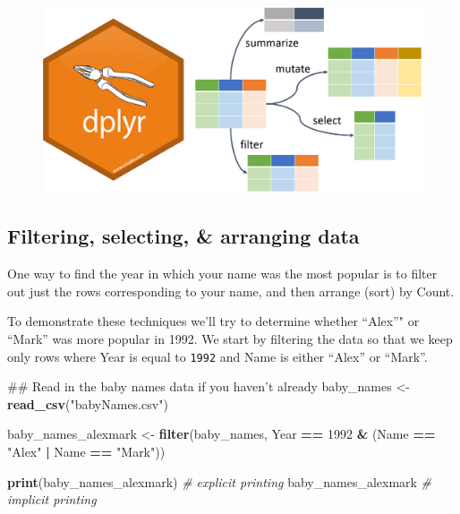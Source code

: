 \documentclass[]{book}
\newenvironment{Shaded}{\begin{snugshade}}{\end{snugshade}}
\newcommand{\KeywordTok}[1]{\textcolor[rgb]{0.13,0.29,0.53}{\textbf{#1}}}
\newcommand{\DecValTok}[1]{\textcolor[rgb]{0.00,0.00,0.81}{#1}}
\newcommand{\StringTok}[1]{\textcolor[rgb]{0.31,0.60,0.02}{#1}}
\newcommand{\CommentTok}[1]{\textcolor[rgb]{0.56,0.35,0.01}{\textit{#1}}}
\newcommand{\OperatorTok}[1]{\textcolor[rgb]{0.81,0.36,0.00}{\textbf{#1}}}
\newcommand{\NormalTok}[1]{#1}
\begin{document}
\begin{figure}
\centering
\includegraphics{R/Rintro/images/dplyr.png}
\caption{}
\end{figure}

\subsection{Filtering, selecting, \& arranging
data}\label{filtering-selecting-arranging-data}

One way to find the year in which your name was the most popular is to
filter out just the rows corresponding to your name, and then arrange
(sort) by Count.

To demonstrate these techniques we'll try to determine whether ``Alex''"
or ``Mark'' was more popular in 1992. We start by filtering the data so
that we keep only rows where Year is equal to \texttt{1992} and Name is
either ``Alex'' or ``Mark''.

\begin{Shaded}
\begin{Highlighting}[]
\NormalTok{## Read in the baby names data if you haven't already}
\NormalTok{baby_names <-}\StringTok{ }\KeywordTok{read_csv}\NormalTok{(}\StringTok{"babyNames.csv"}\NormalTok{)}
\end{Highlighting}
\end{Shaded}

\begin{Shaded}
\begin{Highlighting}[]
\NormalTok{baby_names_alexmark <-}\StringTok{ }\KeywordTok{filter}\NormalTok{(baby_names, }
\NormalTok{             Year }\OperatorTok{==}\StringTok{ }\DecValTok{1992} \OperatorTok{&}\StringTok{ }\NormalTok{(Name }\OperatorTok{==}\StringTok{ "Alex"} \OperatorTok{|}\StringTok{ }\NormalTok{Name }\OperatorTok{==}\StringTok{ "Mark"}\NormalTok{))}

\KeywordTok{print}\NormalTok{(baby_names_alexmark) }\CommentTok{# explicit printing             }
\NormalTok{baby_names_alexmark }\CommentTok{# implicit printing}
\end{Highlighting}
\end{Shaded}
\end{document}
